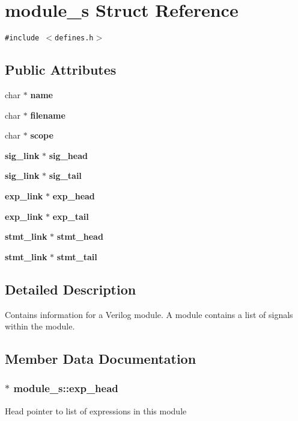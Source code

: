 \section{module\_\-s  Struct Reference}
\label{structmodule__s}
{\tt \#include $<$defines.h$>$}

\subsection*{Public Attributes}
\begin{CompactItemize}
\item 
char $\ast$ {\bf name}
\item 
char $\ast$ {\bf filename}
\item 
char $\ast$ {\bf scope}
\item 
{\bf sig\_\-link} $\ast$ {\bf sig\_\-head}
\item 
{\bf sig\_\-link} $\ast$ {\bf sig\_\-tail}
\item 
{\bf exp\_\-link} $\ast$ {\bf exp\_\-head}
\item 
{\bf exp\_\-link} $\ast$ {\bf exp\_\-tail}
\item 
{\bf stmt\_\-link} $\ast$ {\bf stmt\_\-head}
\item 
{\bf stmt\_\-link} $\ast$ {\bf stmt\_\-tail}
\end{CompactItemize}


\subsection{Detailed Description}
Contains information for a Verilog module. A module contains a list of signals within the module. 



\subsection{Member Data Documentation}
\subsubsection{$\ast$ module\_\-s::exp\_\-head}\label{structmodule__s_m5}


Head pointer to list of expressions in this module 

